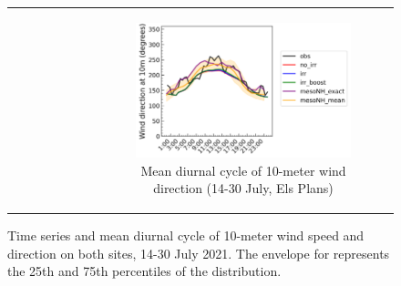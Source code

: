 \begin{figure}[t]
\begin{tabular}{cc}
\begin{subfigure}[t]{0.5\textwidth}
        \end{subfigure} &
        \begin{subfigure}[t]{0.5\textwidth}
            \caption{Mean diurnal cycle of 10-meter wind direction (14-30 July, Els Plans)}
            \includegraphics[width=\textwidth]{images/chap5/SOP_TS_DC/diurnal_cycle_elsplans_wind_direction_10m.png}
        \end{subfigure}
    \end{tabular}
    \caption{Time series and mean diurnal cycle of 10-meter wind speed and direction on both sites, 14-30 July 2021. The envelope for \mesomean represents the 25th and 75th percentiles of the distribution.}
    \label{fig:bothsites_wind}
\end{figure}

\clearpage


